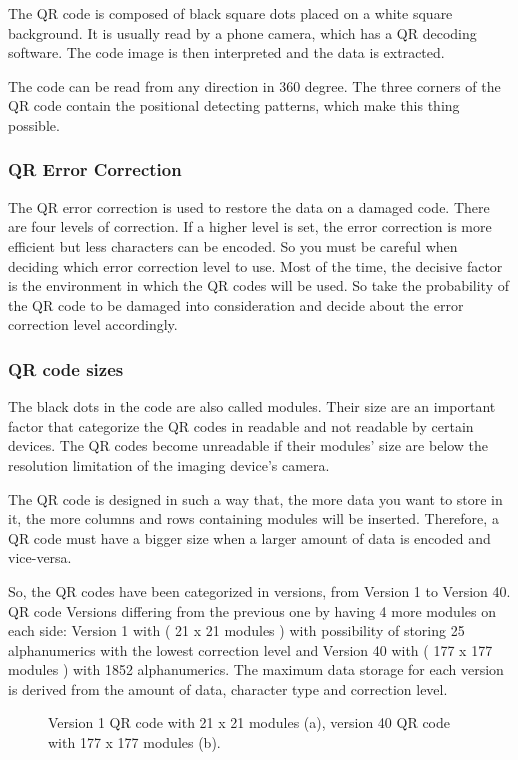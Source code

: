 The QR code is  composed of black square dots placed on a white square background. It is usually read by a phone camera, which has a QR decoding software. The code image is then interpreted and the data is extracted.

The code can be read from any direction in 360 degree. The three corners of the QR code contain the positional detecting patterns, which make this thing possible.

\subsubsection{QR Error Correction}
The QR error correction is used to restore the data on a damaged code. There are four levels of correction. If a higher level is set, the error correction is more efficient but less characters can be encoded. So you must be careful when deciding which error correction level to use. Most of the time, the decisive factor is the environment in which the QR codes will be used. So take the probability of the QR code to be damaged into consideration and decide about the error correction level accordingly.

\subsubsection{QR code sizes}
The black dots in the code are also called modules. Their size are an important factor that categorize the QR codes in readable and not readable by certain devices. The QR codes become unreadable if their modules’ size are below the resolution limitation of the imaging device’s camera.

The QR code is designed in such a way that, the more data you want to store in it, the more columns and rows containing modules will be inserted. Therefore, a QR code must have a bigger size when a larger amount of data is encoded and vice-versa.

So, the QR codes have been categorized in versions, from Version 1 to Version 40.  QR code Versions differing from the previous one by having 4 more modules on each side: Version 1 with ( 21 x 21 modules ) with possibility of storing 25 alphanumerics with the lowest correction level and Version 40 with  ( 177 x 177 modules ) with 1852 alphanumerics. The maximum data storage for each version is derived from the amount of data, character type and correction level.


\begin{figure}[!ht]
  \centering
 \hspace{0.09cm}
  \caption{Version 1 QR code with 21 x 21 modules (a), version 40 QR code with 177 x 177 modules (b).}
  \label{fig1.1}
\end{figure}

